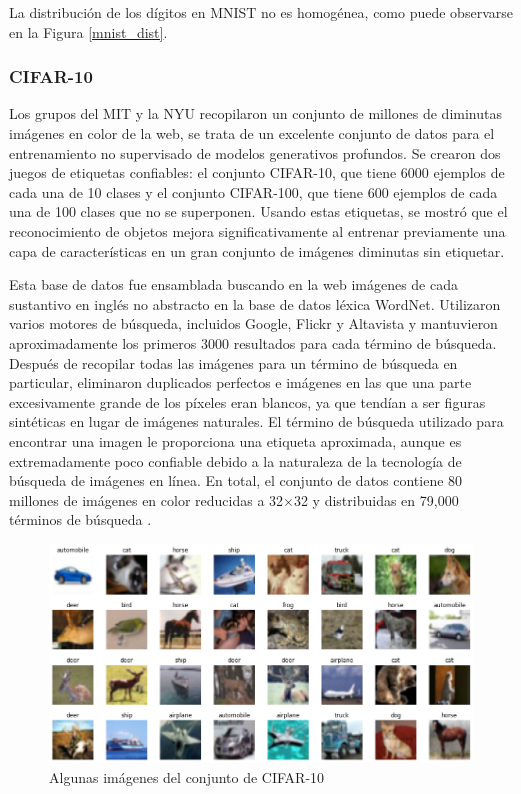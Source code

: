 La distribución de los dígitos en MNIST no es homogénea, como puede observarse en la Figura \ref{mnist_dist}.

\subsubsection{CIFAR-10}
Los grupos del MIT y la NYU recopilaron un conjunto de millones de diminutas imágenes en color de la web, se trata de un excelente conjunto de datos para el entrenamiento no supervisado de modelos generativos profundos. Se crearon dos juegos de etiquetas confiables: el conjunto CIFAR-10, que tiene 6000 ejemplos de cada una de 10 clases y el conjunto CIFAR-100, que tiene 600 ejemplos de cada una de 100 clases que no se superponen. Usando estas etiquetas, se mostró que el reconocimiento de objetos mejora significativamente al entrenar previamente una capa de características en un gran conjunto de imágenes diminutas sin etiquetar.

Esta base de datos fue ensamblada buscando en la web imágenes de cada sustantivo en inglés no abstracto en la base de datos léxica WordNet. Utilizaron varios motores de búsqueda, incluidos Google, Flickr y Altavista y mantuvieron aproximadamente los primeros 3000 resultados para cada término de búsqueda. Después de recopilar todas las imágenes para un término de búsqueda en particular, eliminaron duplicados perfectos e imágenes en las que una parte excesivamente grande de los píxeles eran blancos, ya que tendían a ser figuras sintéticas en lugar de imágenes naturales. El término de búsqueda utilizado para encontrar una imagen le proporciona una etiqueta aproximada, aunque es extremadamente poco confiable debido a la naturaleza de la tecnología de búsqueda de imágenes en línea. En total, el conjunto de datos contiene 80 millones de imágenes en color reducidas a 32×32 y distribuidas en 79,000 términos de búsqueda \cite{Krizhevsky09learningmultiple}.

\begin{figure}[h!]
    \centering
    \includegraphics[width=\textwidth]{images/cifar-10/cifar10example.png}
    \caption{Algunas imágenes del conjunto de CIFAR-10 \cite{Krizhevsky09learningmultiple}}
    \label{cifar}
\end{figure}

